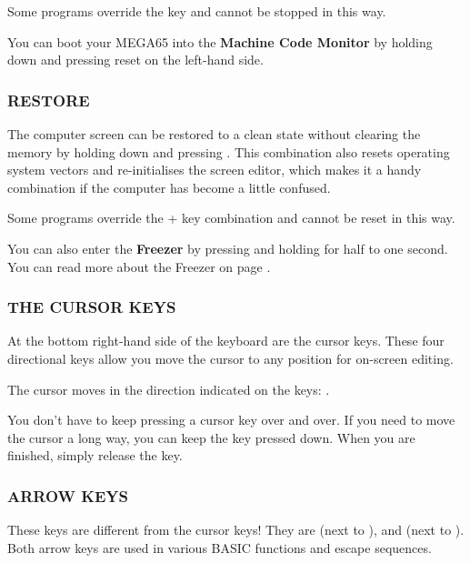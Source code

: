 Some programs override the  key and cannot be stopped in this way.

You can boot your MEGA65 into the {\bf Machine Code Monitor} by holding down  and pressing reset on the left-hand side.

\subsubsection{RESTORE}
The computer screen can be restored to a clean state without clearing the memory by holding down  and pressing . This combination also resets operating system vectors and re-initialises the screen editor, which makes it a handy combination if the computer has become a little confused.

Some programs override the  +  key combination and cannot be reset in this way.

You can also enter the {\bf Freezer} by pressing and holding  for half to one second. You can
read more about the Freezer on page \pageref{sec:freezer}.

\subsubsection{THE CURSOR KEYS}
\nopagebreak
At the bottom right-hand side of the keyboard are the cursor keys. These four directional keys allow you move the cursor to any position for on-screen editing.

The cursor moves in the direction indicated on the keys: \megakey{$\leftarrow$} \megakey{$\uparrow$} \megakey{$\rightarrow$} \megakey{$\downarrow$}.

You don't have to keep pressing a cursor key over and over. If you need to move the cursor a long way, you can keep the key pressed down. When you are finished, simply release the key.

\subsubsection{ARROW KEYS}
These keys are different from the cursor keys! They are \megakeywhite{$\leftarrow$} (next to ), and \megakeywhite{$\uparrow$} (next to ).
Both arrow keys are used in various BASIC functions and escape sequences.

